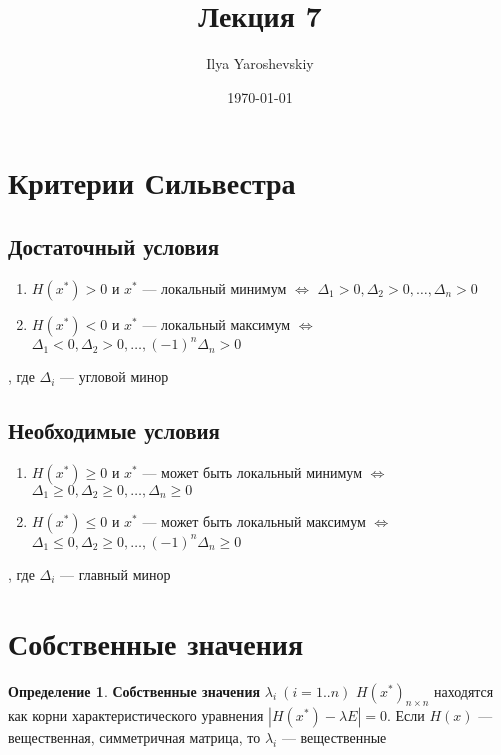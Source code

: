 \documentclass[english]{article}
\author{Ilya Yaroshevskiy}
\date{\today}
\title{Лекция 7}
\theoremstyle{plain}
\theoremstyle{remark}
\theoremstyle{definition}
\newtheorem*{definition}{Определение}
\begin{document}
\maketitle
\tableofcontents

\newcommand{\diff}[2]{\frac{\partial #1}{\partial #2}}


\section{Критерии Сильвестра}
\label{sec:org1b9587a}
\subsection{Достаточный условия}
\label{sec:org374fce3}
\begin{enumerate}
\item \(H(x^*) > 0\) и \(x^*\) --- локальный минимум \(\Leftrightarrow\) \(\Delta_1 > 0, \Delta_2 > 0, \dots , \Delta_n > 0\)
\item \(H(x^*) < 0\) и \(x^*\) --- локальный максимум \(\Leftrightarrow\) \(\Delta_1 < 0, \Delta_2 > 0, \dots , (-1)^n\Delta_n > 0\)
\end{enumerate}
, где \(\Delta_i\) --- угловой минор
\subsection{Необходимые условия}
\label{sec:org1465308}
\begin{enumerate}
\item \(H(x^*) \ge 0\) и \(x^*\) --- может быть локальный минимум \(\Leftrightarrow\) \(\Delta_1 \ge 0, \Delta_2 \ge 0, \dots, \Delta_n \ge 0\)
\item \(H(x^*) \le 0\) и \(x^*\) --- может быть локальный максимум \(\Leftrightarrow\) \(\Delta_1 \le 0, \Delta_2 \ge 0, \dots, (-1)^n\Delta_n \ge 0\)
\end{enumerate}
, где \(\Delta_i\) --- главный минор

\section{Собственные значения}
\label{sec:orgf333c37}
\begin{definition}
\textbf{Собственные значения} \(\lambda_i\ (i = 1..n)\) \(H(x^*)_{n\times n}\) находятся как корни характеристического уравнения \(|H(x^*) - \lambda E| = 0\). Если \(H(x)\) --- вещественная, симметричная матрица, то \(\lambda_i\) --- вещественные
\end{definition}
\end{document}
